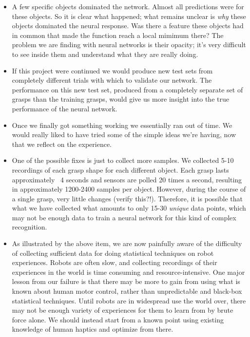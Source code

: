 \documentclass[12pt, oneside]{article}
\begin{document}
\begin{itemize}
\item A few specific objects dominated the network. Almost all predictions were for these objects. So it is clear what happened; what remains unclear is \emph{why} these objects dominated the neural response. Was there a feature these objects had in common that made the function reach a local mimimum there? The problem we are finding with neural networks is their opacity; it's very difficult to see inside them and understand what they are really doing.
\item If this project were continued we would produce new test sets from completely different trials with which to validate our network. The performance on this new test set, produced from a completely separate set of grasps than the training grasps, would give us more insight into the true performance of the neural network.
\item Once we finally got something working we essentially ran out of time. We would really liked to have tried some of the simple ideas we're having, now that we reflect on the experience.
\item One of the possible fixes is just to collect more samples. We collected 5-10 recordings of each grasp shape for each different object. Each grasp lasts approximately ~4 seconds and sensors are polled 20 times a second, resulting in approximately 1200-2400 samples per object. However, during the course of a single grasp, very little changes (verify this?!). Therefore, it is possible that what we have collected what amounts to only 15-30 \emph{unique} data points, which may not be enough data to train a neural network for this kind of complex recognition.
\item As illustrated by the above item, we are now painfully aware of the difficulty of collecting sufficient data for doing statistical techniques on robot experiences. Robots are often slow, and collecting recordings of their experiences in the world is time consuming and resource-intensive. One major lesson from our failure is that there may be more to gain from using what is known about human motor control, rather than unpredictable and black-box statistical techniques. Until robots are in widespread use the world over, there may not be enough variety of experiences for them to learn from by brute force alone. We should instead start from a known point using existing knowledge of human haptics and optimize from there.
\end{itemize}
\end{document}
